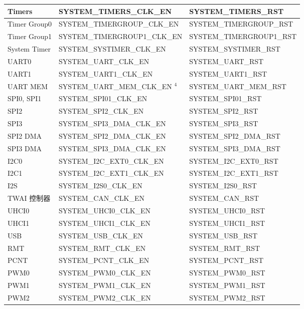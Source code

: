 \documentclass[main\_\_CN.tex]{subfiles}
\begin{document}
\begin{longtable}[c]{ |p{4cm}|p{6cm}|p{6cm}| }
Timers    & SYSTEM\_TIMERS\_CLK\_EN & SYSTEM\_TIMERS\_RST \\\hline
Timer Group0    & SYSTEM\_TIMERGROUP\_CLK\_EN & SYSTEM\_TIMERGROUP\_RST \\\hline
Timer Group1    & SYSTEM\_TIMERGROUP1\_CLK\_EN & SYSTEM\_TIMERGROUP1\_RST \\\hline
System Timer    & SYSTEM\_SYSTIMER\_CLK\_EN & SYSTEM\_SYSTIMER\_RST \\\hline
UART0    & SYSTEM\_UART\_CLK\_EN & SYSTEM\_UART\_RST \\\hline
UART1    & SYSTEM\_UART1\_CLK\_EN & SYSTEM\_UART1\_RST \\\hline
UART MEM    & SYSTEM\_UART\_MEM\_CLK\_EN {\hyperref[table:reset_notes]{$^4$}} & SYSTEM\_UART\_MEM\_RST \\\hline
SPI0, SPI1    & SYSTEM\_SPI01\_CLK\_EN & SYSTEM\_SPI01\_RST \\\hline
SPI2    & SYSTEM\_SPI2\_CLK\_EN & SYSTEM\_SPI2\_RST \\\hline
SPI3    & SYSTEM\_SPI3\_DMA\_CLK\_EN & SYSTEM\_SPI3\_RST \\\hline
SPI2 DMA    & SYSTEM\_SPI2\_DMA\_CLK\_EN & SYSTEM\_SPI2\_DMA\_RST \\\hline
SPI3 DMA    & SYSTEM\_SPI3\_DMA\_CLK\_EN & SYSTEM\_SPI3\_DMA\_RST \\\hline
I2C0    & SYSTEM\_I2C\_EXT0\_CLK\_EN & SYSTEM\_I2C\_EXT0\_RST \\\hline
I2C1    & SYSTEM\_I2C\_EXT1\_CLK\_EN & SYSTEM\_I2C\_EXT1\_RST \\\hline
I2S    & SYSTEM\_I2S0\_CLK\_EN & SYSTEM\_I2S0\_RST \\\hline
TWAI 控制器    & SYSTEM\_CAN\_CLK\_EN & SYSTEM\_CAN\_RST \\\hline
UHCI0    & SYSTEM\_UHCI0\_CLK\_EN & SYSTEM\_UHCI0\_RST \\\hline
UHCI1    & SYSTEM\_UHCI1\_CLK\_EN & SYSTEM\_UHCI1\_RST \\\hline
USB    & SYSTEM\_USB\_CLK\_EN & SYSTEM\_USB\_RST \\\hline
RMT    & SYSTEM\_RMT\_CLK\_EN & SYSTEM\_RMT\_RST \\\hline
PCNT    & SYSTEM\_PCNT\_CLK\_EN & SYSTEM\_PCNT\_RST \\\hline
PWM0    & SYSTEM\_PWM0\_CLK\_EN & SYSTEM\_PWM0\_RST \\\hline
PWM1    & SYSTEM\_PWM1\_CLK\_EN & SYSTEM\_PWM1\_RST \\\hline
PWM2    & SYSTEM\_PWM2\_CLK\_EN & SYSTEM\_PWM2\_RST \\\hline

\end{longtable}
\end{document}
